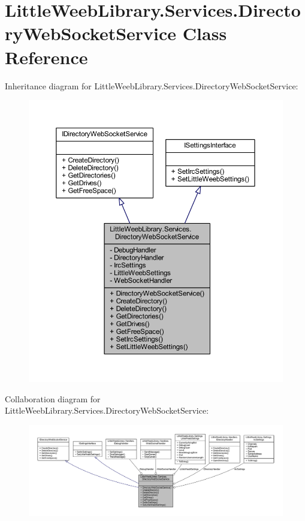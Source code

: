 \hypertarget{class_little_weeb_library_1_1_services_1_1_directory_web_socket_service}{}\section{Little\+Weeb\+Library.\+Services.\+Directory\+Web\+Socket\+Service Class Reference}
\label{class_little_weeb_library_1_1_services_1_1_directory_web_socket_service}


Inheritance diagram for Little\+Weeb\+Library.\+Services.\+Directory\+Web\+Socket\+Service\+:\nopagebreak
\begin{figure}[H]
\begin{center}
\leavevmode
\includegraphics[width=350pt]{class_little_weeb_library_1_1_services_1_1_directory_web_socket_service__inherit__graph}
\end{center}
\end{figure}


Collaboration diagram for Little\+Weeb\+Library.\+Services.\+Directory\+Web\+Socket\+Service\+:\nopagebreak
\begin{figure}[H]
\begin{center}
\leavevmode
\includegraphics[width=350pt]{class_little_weeb_library_1_1_services_1_1_directory_web_socket_service__coll__graph}
\end{center}
\end{figure}
